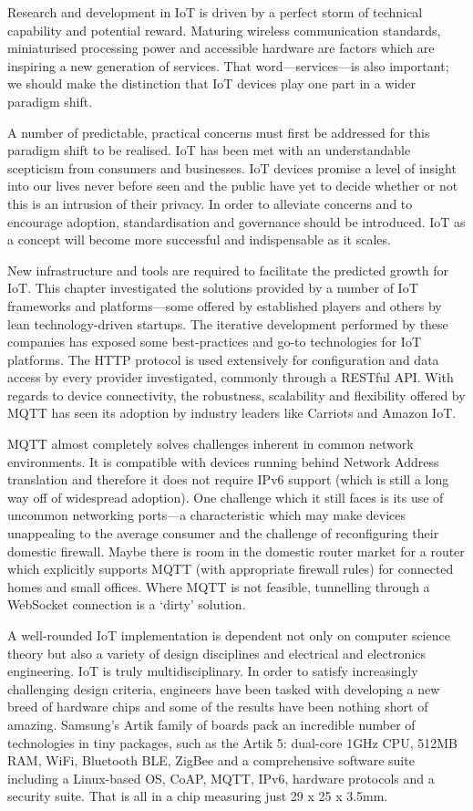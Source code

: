     Research and development in IoT is driven by a perfect storm of technical capability and potential reward. Maturing wireless communication standards, miniaturised processing power and accessible hardware are factors which are inspiring a new generation of services. That word---services---is also important; we should make the distinction that IoT devices play one part in a wider paradigm shift.

    A number of predictable, practical concerns must first be addressed for this paradigm shift to be realised. IoT has been met with an understandable scepticism from consumers and businesses. IoT devices promise a level of insight into our lives never before seen and the public have yet to decide whether or not this is an intrusion of their privacy. In order to alleviate concerns and to encourage adoption, standardisation and governance should be introduced. IoT as a concept will become more successful and indispensable as it scales.

    New infrastructure and tools are required to facilitate the predicted growth for IoT. This chapter investigated the solutions provided by a number of IoT frameworks and platforms---some offered by established players and others by lean technology-driven startups. The iterative development performed by these companies has exposed some best-practices and go-to technologies for IoT platforms. The HTTP protocol is used extensively for configuration and data access by every provider investigated, commonly through a RESTful API. With regards to device connectivity, the robustness, scalability and flexibility offered by MQTT has seen its adoption by industry leaders like Carriots and Amazon IoT.

    MQTT almost completely solves challenges inherent in common network environments. It is compatible with devices running behind Network Address translation and therefore it does not require IPv6 support (which is still a long way off of widespread adoption). One challenge which it still faces is its use of uncommon networking ports---a characteristic which may make devices unappealing to the average consumer and the challenge of reconfiguring their domestic firewall. Maybe there is room in the domestic router market for a router which explicitly supports MQTT (with appropriate firewall rules) for connected homes and small offices. Where MQTT is not feasible, tunnelling through a WebSocket connection is a `dirty' solution.

    A well-rounded IoT implementation is dependent not only on computer science theory but also a variety of design disciplines and electrical and electronics engineering. IoT is truly multidisciplinary. In order to satisfy increasingly challenging design criteria, engineers have been tasked with developing a new breed of hardware chips and some of the results have been nothing short of amazing. Samsung's Artik family of boards pack an incredible number of technologies in tiny packages, such as the Artik 5: dual-core 1GHz CPU, 512MB RAM, WiFi, Bluetooth BLE, ZigBee and a comprehensive software suite including a Linux-based OS, CoAP, MQTT, IPv6, hardware protocols and a security suite. That is all in a chip measuring just 29 x 25 x 3.5mm.

